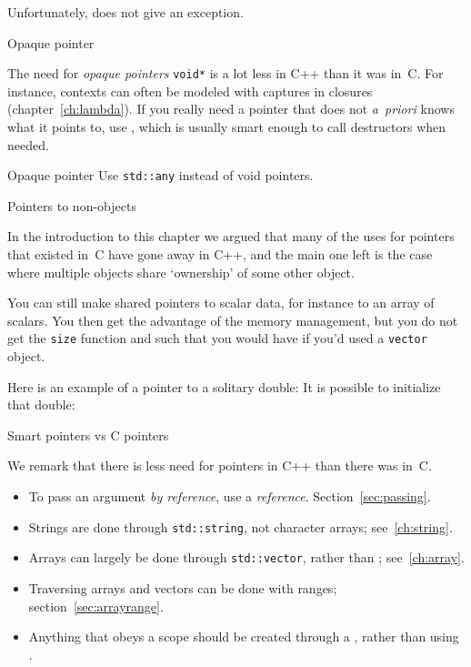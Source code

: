 Unfortunately,  does not give an exception.

 {Opaque pointer}

The need for \emph{opaque pointers}
\lstinline{void*}
is a lot less in C++ than it was in~C. For
instance, contexts can often be modeled with captures in closures
(chapter~\ref{ch:lambda}). If you really need a pointer that does not
\textit{a~priori} knows what it points to, use ,
which is usually smart enough to call destructors when needed.


\begin{slide}{Opaque pointer}
  \label{sl:void-ptr}
  Use \lstinline{std::any} instead of void pointers.

\end{slide}

 {Pointers to non-objects}

In the introduction to this chapter we argued that many of the uses
for pointers that existed in~C have gone away in C++, and the main one
left is the case where multiple objects share `ownership' of some
other object.

You can still make shared pointers to scalar data, for instance to an
array of scalars. You then get the advantage of the memory management,
but you do not get the \lstinline{size} function and such that you would have
if you'd used a \lstinline{vector} object.

Here is an example of a pointer to a solitary double:
%
%
It is possible to initialize that double:
%

 {Smart pointers vs C pointers}

We remark that there is less need for pointers in C++
than there was in~C.

\begin{itemize}
\item To pass an argument
  \emph{by reference},
  use a \emph{reference}.
  Section~\ref{sec:passing}.
\item Strings are done through \lstinline{std::string}, not character arrays;
  see~\ref{ch:string}.
\item Arrays can largely be done through \lstinline{std::vector}, rather than
  ; see~\ref{ch:array}.
\item Traversing arrays and vectors can be done with ranges;
  section~\ref{sec:arrayrange}.
\item Anything that obeys a scope should be created through a
  , rather than using .
\end{itemize}

